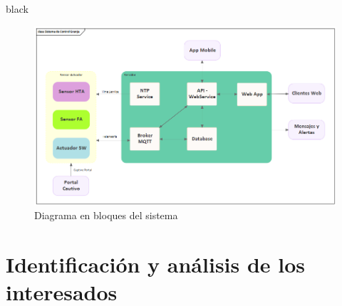 \documentclass[11pt]{charter}
\begin{document}
\begin{consigna}{black}

\vspace{25px}

\begin{figure}[htpb]
\centering 
\includegraphics[width=.7\textwidth]{./Figuras/diagBloquesSCG.png}
\caption{Diagrama en bloques del sistema}
\label{fig:diagBloques}
\end{figure}

\vspace{25px}
\end{consigna}


\section{Identificación y análisis de los interesados}
\label{sec:interesados}
\end{document}

